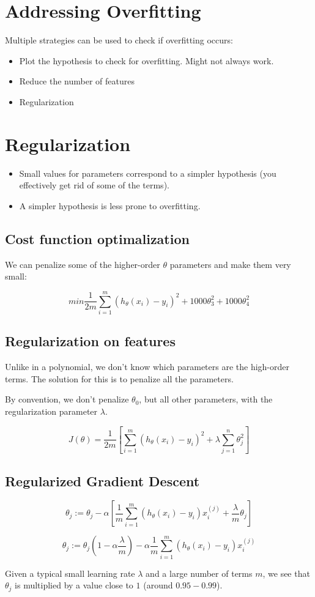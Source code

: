 \section{Addressing Overfitting}
Multiple strategies can be used to check if overfitting occurs:
\begin{itemize}
    \item Plot the hypothesis to check for overfitting. Might not always work.
    \item Reduce the number of features
    \item Regularization
\end{itemize}

\section{Regularization}

\begin{itemize}
    \item Small values for parameters correspond to a simpler hypothesis (you effectively get rid of some of the terms).
    \item A simpler hypothesis is less prone to overfitting.
\end{itemize}

\subsection{Cost function optimalization}
We can penalize some of the higher-order $\theta$ parameters and make them very small:

\[
    min\frac{1}{2m}\sum_{i=1}^{m}\left(h_{\theta}(x_i)-y_i\right)^2 + 1000\theta_3^2 + 1000\theta_4^2
\]

\subsection{Regularization on features}
Unlike in a polynomial, we don't know which parameters are the high-order terms. The solution for this is to penalize all the parameters.

By convention, we don't penalize $\theta_0$, but all other parameters, with the regularization parameter $\lambda$.

\[
    J(\theta) = \frac{1}{2m}\left[\sum_{i=1}^{m}\left(h_{\theta}(x_i)-y_i\right)^2 + \lambda\sum_{j=1}^{n}\theta_j^2\right]
\]

\subsection{Regularized Gradient Descent}
\[
    \theta_j := \theta_j - \alpha\left[\frac{1}{m}\sum_{i=1}^{m}\left(h_{\theta}(x_i)-y_i\right)x_i^{(j)} + \frac{\lambda}{m}\theta_j\right]
\]

\[
    \theta_j := \theta_j\left(1-\alpha\frac{\lambda}{m}\right) - \alpha\frac{1}{m}\sum_{i=1}^{m}\left(h_{\theta}(x_i)-y_i\right)x_i^{(j)}
\]

Given a typical small learning rate $\lambda$ and a large number of terms $m$, we see that $\theta_j$ is multiplied by a value close to $1$ (around $0.95-0.99$).
